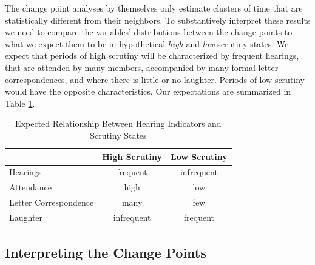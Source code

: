 \documentclass[a4paper]{article}\usepackage[]{graphicx}\usepackage[]{color}
\begin{document}
The change point analyses by themselves only estimate clusters of time that are statistically different from their neighbors. To substantively interpret these results we need to compare the variables' distributions between the change points to what we expect them to be in hypothetical \emph{high} and \emph{low} scrutiny states. We expect that periods of high scrutiny will be characterized by frequent hearings, that are attended by many members, accompanied by many formal letter correspondences, and where there is little or no laughter. Periods of low scrutiny would have the opposite characteristics. Our expectations are summarized in Table \ref{ExpectedTable}.

\begin{table}
    \caption{Expected Relationship Between Hearing Indicators and Scrutiny States}
    \label{ExpectedTable}
    \begin{center}
        \begin{tabular}{l | c c}
            \hline
            & High Scrutiny & Low Scrutiny \\
            \hline \hline
            Hearings & frequent & infrequent \\[0.25cm]
            Attendance & high & low \\[0.25cm]
            Letter Correspondence & many & few \\[0.25cm]
            Laughter & infrequent & frequent \\
            \hline
        \end{tabular}
    \end{center}
\end{table}

\subsection{Interpreting the Change Points}
\end{document}
